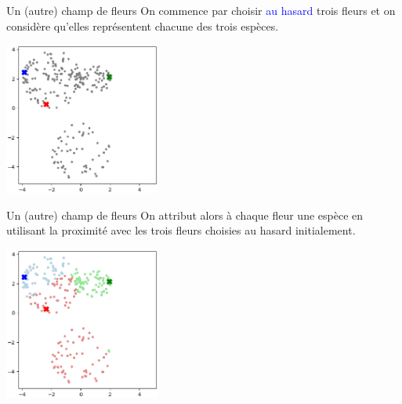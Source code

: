 \documentclass[10pt]{beamer}
\begin{document}
\begin{frame}{\Ctitle}{\stitle}
    \begin{exampleblock}{Un (autre) champ de fleurs}
        On commence par choisir \textcolor{blue}{au hasard} trois fleurs et on considère qu'elles représentent chacune des trois espèces.
        \begin{center}
            \includegraphics[height=5cm]{ex2_kmeans0.eps}
        \end{center}
    \end{exampleblock}
\end{frame}

\begin{frame}{\Ctitle}{\stitle}
    \begin{exampleblock}{Un (autre) champ de fleurs}
        On attribut alors à chaque fleur une espèce en utilisant la proximité avec les trois fleurs choisies au hasard initialement.
        \begin{center}
            \includegraphics[height=5cm]{ex2_kmeans1.eps}
        \end{center}
    \end{exampleblock}
\end{frame}
\end{document}
